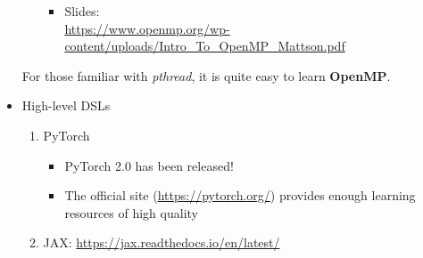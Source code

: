 \documentclass{article}
\begin{document}
\begin{itemize}
\begin{itemize}
\begin{itemize}
            \item Slides:\\
            \href{https://www.openmp.org/wp-content/uploads/Intro\_To\_OpenMP\_Mattson.pdf}{https://www.openmp.org/wp-content/uploads/Intro\_To\_OpenMP\_Mattson.pdf}
        \end{itemize}
    \end{itemize}
    For those familiar with \emph{pthread}, it is quite easy to learn \textbf{OpenMP}.
    \item High-level DSLs
    \begin{enumerate}
        \item PyTorch
        \begin{itemize}
            \item PyTorch 2.0 has been released!
            \item The official site (\href{https://pytorch.org/}{https://pytorch.org/}) provides enough learning resources of high quality
        \end{itemize}
        \item JAX:
        \href{https://jax.readthedocs.io/en/latest/}{https://jax.readthedocs.io/en/latest/}
    \end{enumerate}
\end{itemize}
\end{document}
